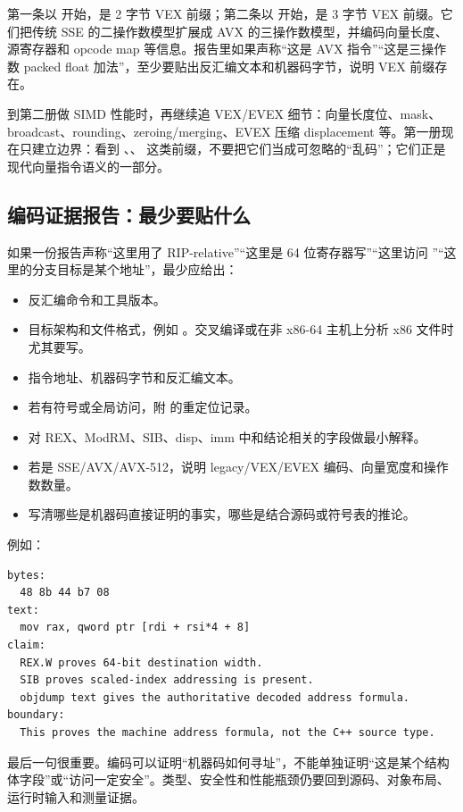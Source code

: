 第一条以  开始，是 2 字节 VEX 前缀；第二条以  开始，是 3 字节 VEX 前缀。它们把传统 SSE 的二操作数模型扩展成 AVX 的三操作数模型，并编码向量长度、源寄存器和 opcode map 等信息。报告里如果声称“这是 AVX 指令”“这是三操作数 packed float 加法”，至少要贴出反汇编文本和机器码字节，说明 VEX 前缀存在。

到第二册做 SIMD 性能时，再继续追 VEX/EVEX 细节：向量长度位、mask、broadcast、rounding、zeroing/merging、EVEX 压缩 displacement 等。第一册现在只建立边界：看到 、、 这类前缀，不要把它们当成可忽略的“乱码”；它们正是现代向量指令语义的一部分。

\subsection{编码证据报告：最少要贴什么}

如果一份报告声称“这里用了 RIP-relative”“这里是 64 位寄存器写”“这里访问 ”“这里的分支目标是某个地址”，最少应给出：

\begin{itemize}
  \item 反汇编命令和工具版本。
  \item 目标架构和文件格式，例如 。交叉编译或在非 x86-64 主机上分析 x86 文件时尤其要写。
  \item 指令地址、机器码字节和反汇编文本。
  \item 若有符号或全局访问，附  的重定位记录。
  \item 对 REX、ModRM、SIB、disp、imm 中和结论相关的字段做最小解释。
  \item 若是 SSE/AVX/AVX-512，说明 legacy/VEX/EVEX 编码、向量宽度和操作数数量。
  \item 写清哪些是机器码直接证明的事实，哪些是结合源码或符号表的推论。
\end{itemize}

例如：

\begin{lstlisting}[numbers=none,caption={编码证据记录示例}]
bytes:
  48 8b 44 b7 08
text:
  mov rax, qword ptr [rdi + rsi*4 + 8]
claim:
  REX.W proves 64-bit destination width.
  SIB proves scaled-index addressing is present.
  objdump text gives the authoritative decoded address formula.
boundary:
  This proves the machine address formula, not the C++ source type.
\end{lstlisting}

最后一句很重要。编码可以证明“机器码如何寻址”，不能单独证明“这是某个结构体字段”或“访问一定安全”。类型、安全性和性能瓶颈仍要回到源码、对象布局、运行时输入和测量证据。


